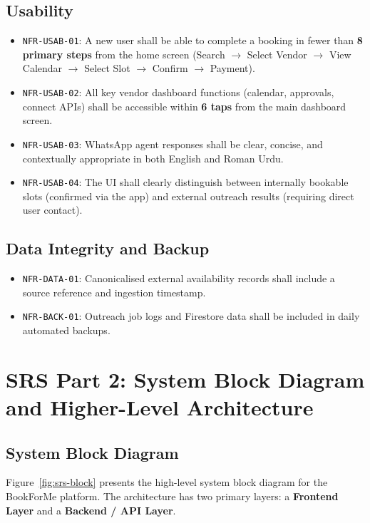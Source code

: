 \subsection{Usability}
\begin{itemize}
  \item \texttt{NFR-USAB-01}: A new user shall be able to complete a booking in fewer
        than \textbf{8 primary steps} from the home screen (Search $\to$ Select
        Vendor $\to$ View Calendar $\to$ Select Slot $\to$ Confirm $\to$ Payment).
  \item \texttt{NFR-USAB-02}: All key vendor dashboard functions (calendar, approvals,
        connect APIs) shall be accessible within \textbf{6 taps} from the main
        dashboard screen.
  \item \texttt{NFR-USAB-03}: WhatsApp agent responses shall be clear, concise, and
        contextually appropriate in both English and Roman Urdu.
  \item \texttt{NFR-USAB-04}: The UI shall clearly distinguish between internally
        bookable slots (confirmed via the app) and external outreach results
        (requiring direct user contact).
\end{itemize}

\subsection{Data Integrity and Backup}
\begin{itemize}
  \item \texttt{NFR-DATA-01}: Canonicalised external availability records shall
        include a source reference and ingestion timestamp.
  \item \texttt{NFR-BACK-01}: Outreach job logs and Firestore data shall be included
        in daily automated backups.
\end{itemize}

\section{SRS Part 2: System Block Diagram and Higher-Level Architecture}
\label{sec:srs-arch}

\subsection{System Block Diagram}

Figure~\ref{fig:srs-block} presents the high-level system block diagram for the
BookForMe platform.  The architecture has two primary layers: a \textbf{Frontend
Layer} and a \textbf{Backend / API Layer}.

